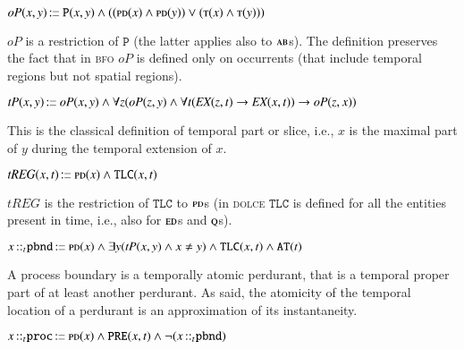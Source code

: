 \documentclass[ao]{iosart2x}
\newcommand{\dolceAxLabel}{\textrm{a$_\texttt{d}$}}
\newcommand{\dbDefLabel}{\textrm{d$_\texttt{db}$}}
\newcounter{cntdbdf}
\newcommand{\dbdf}[1]{\refstepcounter{cntdbdf}\begin{small}{\bf \dbDefLabel\thecntdbdf\label{#1}}\end{small}}
\newcommand{\refdolceax}[1]{({\dolceAxLabel}\ref{#1})}
\newcommand{\pr}[1]{\mathtt{#1}}
\newcommand{\prbfo}[1]{{\textit{{#1}}}}
\newcommand{\cn}[1]{\mathtt{#1}}
\newcommand\textequal{%
 \rule[.08ex]{5pt}{0.35pt}\llap{\rule[.78ex]{5pt}{0.35pt}}}
\newcommand{\sdef}{{\hspace{1.5pt}:\hspace{-2.5pt}\textequal\hspace{3pt}}}
\newcommand{\dolce}{{\textsc{dolce}}}
\newcommand{\bfo}{{\textsc{bfo}}}
\newcommand {\ABdcat} {\textsc{ab}}
\newcommand {\EDdcat} {\textsc{ed}}
\newcommand {\PDdcat} {\textsc{pd}}
\newcommand {\Qdcat} {\textsc{q}}
\newcommand {\Tdcat} {\textsc{t}}
\newcommand {\Pd} {\ensuremath{\pr{P}}}
\newcommand {\PPd} {\ensuremath{\pr{PP}}}
\newcommand {\ATd} {\ensuremath{\pr{AT}}}
\newcommand {\PREd} {\ensuremath{\pr{PRE}}}
\newcommand {\TLCd} {\ensuremath{\pr{TLC}}}
\newcommand{\procbcat}{\cn{proc}}
\newcommand{\pbndbcat}{\cn{pbnd}}
\newcommand{\bfoopart}{\prbfo{oP}}
\newcommand{\bfotpart}{\prbfo{tP}}
\newcommand{\bfotppart}{\prbfo{tPP}}
\newcommand{\bfoexist}{\prbfo{EX}}
\newcommand{\bfoiof}[1]{{\,::_{#1\:\!}}}
\newcommand{\bfotregof}{\prbfo{tREG}}
\begin{document}
\item[\dbdf{d2b_opart}] $\bfoopart(x,y) \sdef \Pd(x,y) \land ((\PDdcat(x) \land \PDdcat(y)) \lor (\Tdcat(x) \land \Tdcat(y)))$

\vspace{1pt}
$\bfoopart$ is a restriction of $\Pd$ (the latter applies also to $\ABdcat$s). The definition preserves the fact that in {\bfo} $\bfoopart$ is defined only on occurrents (that include temporal regions but not spatial regions). 

\item[\dbdf{d2b_tpart}] $\bfotpart(x,y) \sdef \bfoopart(x,y) \land 
\forall z (\bfoopart(z,y) \land \forall t (\bfoexist(z,t) \to \bfoexist(x,t)) \to \bfoopart(z,x))$

\vspace{1pt}
This is the classical definition of temporal part or slice, i.e., $x$ is the maximal part of $y$ during the temporal extension of $x$.

\item[\dbdf{d2b_tregof}] $\bfotregof(x,t) \sdef \PDdcat(x) \land \TLCd(x,t)$

\vspace{1pt}
$\bfotregof$ is the restriction of $\TLCd$ to $\PDdcat$s (in {\dolce} $\TLCd$ is defined for all the entities present in time, i.e., also for $\EDdcat$s and $\Qdcat$s).  

%
 
\item[\dbdf{d2b_pbnd}] $x \bfoiof{t} \pbndbcat \sdef \PDdcat(x) \land \exists y(\bfotpart(x,y) \land x \neq y) \land \TLCd(x,t) \land \ATd(t)$

\vspace{1pt}
A process boundary is a temporally atomic perdurant, that is a temporal proper part of at least another perdurant. As said, the atomicity of the temporal location of a perdurant is an approximation of its instantaneity. 

%
%
%

\item[\dbdf{d2b_proc}] $x \bfoiof{t} \procbcat \sdef \PDdcat(x) \land \PREd(x,t) \land \neg(x \bfoiof{t} \pbndbcat)$
\end{document}
